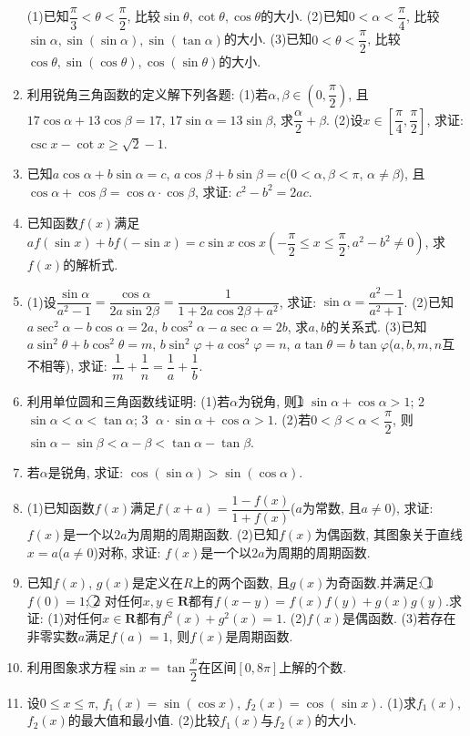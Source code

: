 \documentclass[10pt,a4paper]{article}
\begin{document}
\begin{enumerate}[1.]
(1)已知$\dfrac{\pi }3<\theta <\dfrac{\pi }2$, 比较$\sin \theta ,\cot \theta ,\cos \theta$的大小.
(2)已知$0<\alpha <\dfrac{\pi }4$, 比较$\sin \alpha ,\sin (\sin \alpha),\sin (\tan \alpha)$的大小.
(3)已知$0<\theta <\dfrac{\pi }2$, 比较$\cos \theta ,\sin (\cos \theta),\cos (\sin \theta)$的大小.
\item 利用锐角三角函数的定义解下列各题:
(1)若$\alpha ,\beta \in (0,\dfrac{\pi }2)$, 且$17\cos \alpha +13\cos \beta =17$, $17\sin \alpha =13\sin \beta$, 求$\dfrac{\alpha }2+\beta$.
(2)设$x\in [\dfrac{\pi }4,\dfrac{\pi }2]$, 求证: $\csc x-\cot x\ge \sqrt 2-1$.
\item 已知$a\cos \alpha +b\sin \alpha =c$, $a\cos \beta +b\sin \beta =c$($0<\alpha ,\beta <\pi$, $\alpha \ne \beta$), 且$\cos \alpha +\cos \beta =\cos \alpha \cdot \cos \beta$, 求证: $c^2-b^2=2ac$.
\item 已知函数$f(x)$满足$af(\sin x)+bf(-\sin x)=c\sin x\cos x(-\dfrac{\pi }2\le x\le \dfrac{\pi }2,a^2-b^2\ne 0)$, 求$f(x)$的解析式.
\item (1)设$\dfrac{\sin \alpha}{a^2-1}=\dfrac{\cos \alpha }{2a\sin 2\beta }=\dfrac 1{1+2a\cos 2\beta +a^2}$, 求证: $\sin \alpha =\dfrac{a^2-1}{a^2+1}$.
(2)已知$a\sec ^2\alpha -b\cos \alpha =2a$, $b\cos ^2\alpha -a\sec \alpha =2b$, 求$a,b$的关系式.
(3)已知$a\sin ^2\theta +b\cos ^2\theta =m$, $b\sin ^2\varphi +a\cos ^2\varphi =n$, $a\tan \theta =b\tan \varphi$($a,b,m,n$互不相等), 求证: $\dfrac 1m+\dfrac 1n=\dfrac 1a+\dfrac 1b$.
\item 利用单位圆和三角函数线证明:
(1)若$\alpha$为锐角, 则\textcircled{1} $\sin \alpha +\cos \alpha >1$; \textcircled{2} $\sin \alpha <\alpha <\tan \alpha$; \textcircled{3} $\alpha \cdot \sin \alpha +\cos \alpha >1$.
(2)若$0<\beta <\alpha <\dfrac{\pi }2$, 则$\sin \alpha -\sin \beta <\alpha -\beta <\tan \alpha -\tan \beta$.
\item 若$\alpha$是锐角, 求证: $\cos (\sin \alpha)>\sin (\cos \alpha)$.
\item (1)已知函数$f(x)$满足$f(x+a)=\dfrac{1-f(x)}{1+f(x)}$($a$为常数, 且$a\ne 0$), 求证: $f(x)$是一个以$2a$为周期的周期函数.
(2)已知$f(x)$为偶函数, 其图象关于直线$x=a$($a\ne 0$)对称, 求证: $f(x)$是一个以$2a$为周期的周期函数.
\item 已知$f(x)$, $g(x)$是定义在$R$上的两个函数, 且$g(x)$为奇函数.并满足: \textcircled{1} $f(0)=1$; \textcircled{2} 对任何$x,y\in \mathbf{R}$都有$f(x-y)=f(x)f(y)+g(x)g(y)$.求证:
(1)对任何$x\in \mathbf{R}$都有$f^2(x)+g^2(x)=1$.
(2)$f(x)$是偶函数.
(3)若存在非零实数$a$满足$f(a)=1$, 则$f(x)$是周期函数.
\item 利用图象求方程$\sin x=\tan \dfrac x2$在区间$[0,8\pi]$上解的个数.
\item 设$0\le x\le \pi$, $f_1(x)=\sin (\cos x)$, $f_2(x)=\cos (\sin x)$.
(1)求$f_1(x)$, $f_2(x)$的最大值和最小值.
(2)比较$f_1(x)$与$f_2(x)$的大小.
    
\end{enumerate}
\end{document}
